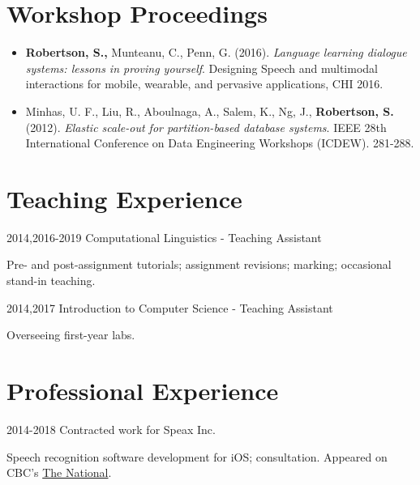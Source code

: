 \documentclass{article}
\begin{document}
\section{Workshop Proceedings}
\begin{itemize}

  \item \textbf{Robertson, S.,} Munteanu, C., Penn, G. (2016).
    \textit{Language learning dialogue systems: lessons in proving yourself}.
    Designing Speech and multimodal interactions for mobile, wearable, and
    pervasive applications, CHI 2016.

  \item Minhas, U. F., Liu, R., Aboulnaga, A., Salem, K., Ng, J.,
    \textbf{Robertson, S.} (2012). \textit{Elastic scale-out for
    partition-based database systems}. IEEE 28th International Conference on
    Data Engineering Workshops (ICDEW). 281-288.

\end{itemize}

\section{Teaching Experience}
\begin{CV}

  \item[2014,2016-2019] Computational Linguistics - Teaching Assistant

    Pre- and post-assignment tutorials; assignment revisions; marking;
    occasional stand-in teaching.

  \item[2014,2017] Introduction to Computer Science - Teaching Assistant

    Overseeing first-year labs.

\end{CV}

\section{Professional Experience}

\begin{CV}
  \item[2014-2018] Contracted work for Speax Inc.

    Speech recognition software development for iOS; consultation. Appeared on
    CBC's \href{https://www.cbc.ca/player/play/1418433091867/}{The National}.

\end{CV}
\end{document}
